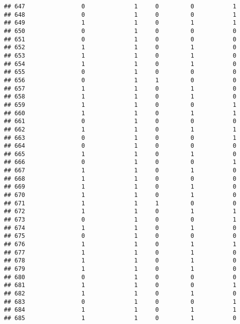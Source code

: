 \documentclass[]{article}
\begin{document}
\begin{verbatim}
## 647                0              1     0         0           1
## 648                0              1     0         0           1
## 649                1              1     0         1           1
## 650                0              1     0         0           0
## 651                0              1     0         0           0
## 652                1              1     0         1           0
## 653                1              1     0         1           0
## 654                1              1     0         1           0
## 655                0              1     0         0           0
## 656                0              1     1         0           0
## 657                1              1     0         1           0
## 658                1              1     0         1           0
## 659                1              1     0         0           1
## 660                1              1     0         1           1
## 661                0              1     0         0           0
## 662                1              1     0         1           1
## 663                0              1     0         0           1
## 664                0              1     0         0           0
## 665                1              1     0         1           0
## 666                0              1     0         0           1
## 667                1              1     0         1           0
## 668                1              1     0         0           0
## 669                1              1     0         1           0
## 670                1              1     0         1           0
## 671                1              1     1         0           0
## 672                1              1     0         1           1
## 673                0              1     0         0           1
## 674                1              1     0         1           0
## 675                0              1     0         0           0
## 676                1              1     0         1           1
## 677                1              1     0         1           0
## 678                1              1     0         1           0
## 679                1              1     0         1           0
## 680                0              1     0         0           0
## 681                1              1     0         0           1
## 682                1              1     0         1           0
## 683                0              1     0         0           1
## 684                1              1     0         1           1
## 685                1              1     0         1           0

\end{verbatim}
\end{document}
